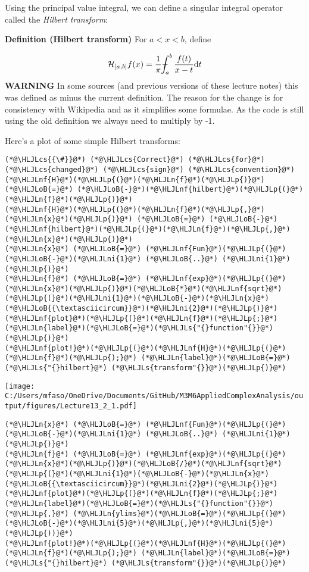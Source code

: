 \documentclass[12pt,landscape]{article}
\newcommand{\HLJLn}[1]{#1}
\newcommand{\HLJLnf}[1]{\textcolor[RGB]{66,102,213}{#1}}
\newcommand{\HLJLs}[1]{\textcolor[RGB]{201,61,57}{#1}}
\newcommand{\HLJLni}[1]{\textcolor[RGB]{59,151,46}{#1}}
\newcommand{\HLJLoB}[1]{\textcolor[RGB]{102,102,102}{\textbf{#1}}}
\newcommand{\HLJLp}[1]{#1}
\newcommand{\HLJLcs}[1]{\textcolor[RGB]{153,153,119}{\textit{#1}}}
\def\D{ {\rm d} }
\def\HH{ {\cal H} }
\def\Xint#1{ \mathchoice
   {\XXint\displaystyle\textstyle{#1} }%
   {\XXint\textstyle\scriptstyle{#1} }%
   {\XXint\scriptstyle\scriptscriptstyle{#1} }%
   {\XXint\scriptscriptstyle\scriptscriptstyle{#1} }%
   \!\int}
\def\XXint#1#2#3{ {\setbox0=\hbox{$#1{#2#3}{\int}$}
     \vcenter{\hbox{$#2#3$}}\kern-.5\wd0} }
\def\dashint{\Xint-}
\begin{document}
{Using the principal value integral, we can define a singular integral operator called the \emph{Hilbert transform}:

\textbf{Definition (Hilbert transform)} For $a < x < b$, define

\[
\HH_{[a,b]} f(x) =  {1 \over \pi} \dashint_a^b {f(t) \over {x-t}} \D t
\]
\textbf{WARNING} In some sources (and previous versions of these lecture notes) this was defined as minus the current definition. The reason for the change is for consistency with Wikipedia and as it simplifies some formulae. As the code is still using the old definition we always need to multiply by -1.

Here's a plot of some simple Hilbert transforms:


\begin{lstlisting}
(*@\HLJLcs{{\#}}@*) (*@\HLJLcs{Correct}@*) (*@\HLJLcs{for}@*) (*@\HLJLcs{changed}@*) (*@\HLJLcs{sign}@*) (*@\HLJLcs{convention}@*)
(*@\HLJLnf{H}@*)(*@\HLJLp{(}@*)(*@\HLJLn{f}@*)(*@\HLJLp{)}@*) (*@\HLJLoB{=}@*) (*@\HLJLoB{-}@*)(*@\HLJLnf{hilbert}@*)(*@\HLJLp{(}@*)(*@\HLJLn{f}@*)(*@\HLJLp{)}@*)
(*@\HLJLnf{H}@*)(*@\HLJLp{(}@*)(*@\HLJLn{f}@*)(*@\HLJLp{,}@*)(*@\HLJLn{x}@*)(*@\HLJLp{)}@*) (*@\HLJLoB{=}@*) (*@\HLJLoB{-}@*)(*@\HLJLnf{hilbert}@*)(*@\HLJLp{(}@*)(*@\HLJLn{f}@*)(*@\HLJLp{,}@*)(*@\HLJLn{x}@*)(*@\HLJLp{)}@*)
(*@\HLJLn{x}@*) (*@\HLJLoB{=}@*) (*@\HLJLnf{Fun}@*)(*@\HLJLp{(}@*)(*@\HLJLoB{-}@*)(*@\HLJLni{1}@*) (*@\HLJLoB{..}@*) (*@\HLJLni{1}@*)(*@\HLJLp{)}@*)
(*@\HLJLn{f}@*) (*@\HLJLoB{=}@*) (*@\HLJLnf{exp}@*)(*@\HLJLp{(}@*)(*@\HLJLn{x}@*)(*@\HLJLp{)}@*)(*@\HLJLoB{*}@*)(*@\HLJLnf{sqrt}@*)(*@\HLJLp{(}@*)(*@\HLJLni{1}@*)(*@\HLJLoB{-}@*)(*@\HLJLn{x}@*)(*@\HLJLoB{{\textasciicircum}}@*)(*@\HLJLni{2}@*)(*@\HLJLp{)}@*)
(*@\HLJLnf{plot}@*)(*@\HLJLp{(}@*)(*@\HLJLn{f}@*)(*@\HLJLp{;}@*) (*@\HLJLn{label}@*)(*@\HLJLoB{=}@*)(*@\HLJLs{"{}function"{}}@*)(*@\HLJLp{)}@*)
(*@\HLJLnf{plot!}@*)(*@\HLJLp{(}@*)(*@\HLJLnf{H}@*)(*@\HLJLp{(}@*)(*@\HLJLn{f}@*)(*@\HLJLp{);}@*) (*@\HLJLn{label}@*)(*@\HLJLoB{=}@*)(*@\HLJLs{"{}hilbert}@*) (*@\HLJLs{transform"{}}@*)(*@\HLJLp{)}@*)
\end{lstlisting}

\texttt{[image: C:/Users/mfaso/OneDrive/Documents/GitHub/M3M6AppliedComplexAnalysis/output/figures/Lecture13\_2\_1.pdf]}
\newpage
\begin{lstlisting}
(*@\HLJLn{x}@*) (*@\HLJLoB{=}@*) (*@\HLJLnf{Fun}@*)(*@\HLJLp{(}@*)(*@\HLJLoB{-}@*)(*@\HLJLni{1}@*) (*@\HLJLoB{..}@*) (*@\HLJLni{1}@*)(*@\HLJLp{)}@*)
(*@\HLJLn{f}@*) (*@\HLJLoB{=}@*) (*@\HLJLnf{exp}@*)(*@\HLJLp{(}@*)(*@\HLJLn{x}@*)(*@\HLJLp{)}@*)(*@\HLJLoB{/}@*)(*@\HLJLnf{sqrt}@*)(*@\HLJLp{(}@*)(*@\HLJLni{1}@*)(*@\HLJLoB{-}@*)(*@\HLJLn{x}@*)(*@\HLJLoB{{\textasciicircum}}@*)(*@\HLJLni{2}@*)(*@\HLJLp{)}@*)
(*@\HLJLnf{plot}@*)(*@\HLJLp{(}@*)(*@\HLJLn{f}@*)(*@\HLJLp{;}@*) (*@\HLJLn{label}@*)(*@\HLJLoB{=}@*)(*@\HLJLs{"{}function"{}}@*)(*@\HLJLp{,}@*) (*@\HLJLn{ylims}@*)(*@\HLJLoB{=}@*)(*@\HLJLp{(}@*)(*@\HLJLoB{-}@*)(*@\HLJLni{5}@*)(*@\HLJLp{,}@*)(*@\HLJLni{5}@*)(*@\HLJLp{))}@*)
(*@\HLJLnf{plot!}@*)(*@\HLJLp{(}@*)(*@\HLJLnf{H}@*)(*@\HLJLp{(}@*)(*@\HLJLn{f}@*)(*@\HLJLp{);}@*) (*@\HLJLn{label}@*)(*@\HLJLoB{=}@*)(*@\HLJLs{"{}hilbert}@*) (*@\HLJLs{transform"{}}@*)(*@\HLJLp{)}@*)
\end{lstlisting}

}
\end{document}
